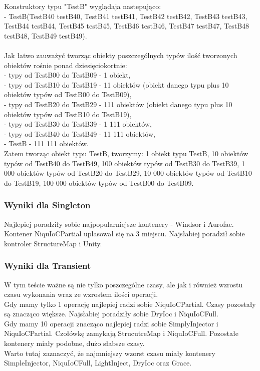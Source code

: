 \documentclass[12pt]{article}
\begin{document}
Konstruktory typu "TestB" wyglądaja nastepująco:\\
- TestB(TestB40 testB40, TestB41 testB41, TestB42 testB42, TestB43 testB43, TestB44 testB44, TestB45 testB45, TestB46 testB46, TestB47 testB47, TestB48 testB48, TestB49 testB49).\\
\\
Jak łatwo zauważyć tworząc obiekty poszczególnych typów ilość tworzonych obiektów rośnie ponad dziesięciokortnie:\\
- typy od TestB00 do TestB09 - 1 obiekt,\\
- typy od TestB10 do TestB19 - 11 obiektów (obiekt danego typu plus 10 obiektów typów od TestB00 do TestB09),\\
- typy od TestB20 do TestB29 - 111 obiektów (obiekt danego typu plus 10 obiektów typów od TestB10 do TestB19),\\
- typy od TestB30 do TestB39 - 1 111 obiektów,\\
- typy od TestB40 do TestB49 - 11 111 obiektów,\\
- TestB - 111 111 obiektów.\\
Zatem tworząc obiekt typu TestB, tworzymy: 1 obiekt typu TestB, 10 obiektów typów od TestB40 do TestB49, 100 obiektów typów od TestB30 do TestB39, 1 000 obiektów typów od TestB20 do TestB29, 10 000 obiektów typów od TestB10 do TestB19, 100 000 obiektów typów od TestB00 do TestB09.

\subsubsection{Wyniki dla Singleton}
Najlepiej poradziły sobie najpopularniejsze kontenery - Windsor i Aurofac. Kontener NiquIoCPartial uplasował się na 3 miejscu. Najsłabiej poradził sobie kontroler StructureMap i Unity.

\subsubsection{Wyniki dla Transient}
W tym teście ważne są nie tylko poszczególne czasy, ale jak i również wzrostu czasu wykonania wraz ze wzrostem ilości operacji.\\
Gdy mamy tylko 1 operację najlepiej radzi sobie NiquIoCPartial. Czasy pozostały są znacząco większe. Najsłabiej poradziły sobie DryIoc i NiquIoCFull.\\
Gdy mamy 10 operacji znacząco najlepiej radzi sobie SimplyInjector i NiquIoCPartial. Czołówkę zamykają StrucutreMap i NiquIoCFull. Pozostałe kontenery miały podobne, dużo słabsze czasy.\\
Warto tutaj zaznaczyć, że najmniejszy wzorst czasu miały kontenery SimpleInjector, NiquIoCFull, LightInject, DryIoc oraz Grace.
\end{document}

